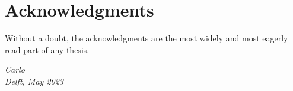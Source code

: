 \chapter*{Acknowledgments}

Without a doubt, the acknowledgments are the most widely and most eagerly read part of any thesis.

\begin{flushright}
{\itshape
Carlo \\
Delft, May 2023
}
\end{flushright}

